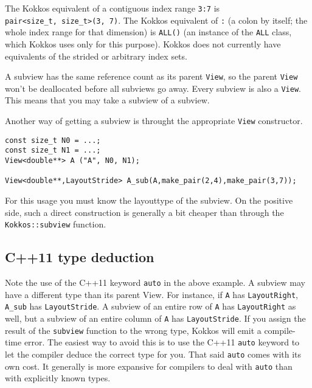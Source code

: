 The Kokkos equivalent of a contiguous index range \texttt{3:7} is \\
\lstinline!pair<size_t, size_t>(3, 7)!.  The Kokkos equivalent of
\texttt{:} (a colon by itself; the whole index range for that
dimension) is \texttt{ALL()} (an instance of the \texttt{ALL} class,
which Kokkos uses only for this purpose).  Kokkos does not currently
have equivalents of the strided or arbitrary index sets.

A subview has the same reference count as its parent \lstinline!View!, so the
parent \lstinline!View! won't be deallocated before all subviews go away.  Every
subview is also a \lstinline!View!.  This means that you may take a subview of a
subview.

Another way of getting a subview is throught the appropriate \lstinline{View} constructor.
\begin{lstlisting}
const size_t N0 = ...;
const size_t N1 = ...;
View<double**> A ("A", N0, N1);

View<double**,LayoutStride> A_sub(A,make_pair(2,4),make_pair(3,7));
\end{lstlisting}
For this usage you must know the layouttype of the subview. 
On the positive side, such a direct construction is generally a bit cheaper than
through the \lstinline!Kokkos::subview! function. 

\subsection{C++11 type deduction}\label{SS:Subviews:How:auto}

Note the use of the C++11 keyword \texttt{auto} in the above example.
A subview may have a different type than its parent View.  For
instance, if \lstinline!A! has \lstinline!LayoutRight!,
\lstinline!A_sub!  has \lstinline!LayoutStride!.  A subview of an
entire row of \lstinline!A! has \lstinline!LayoutRight! as well, but a
subview of an entire column of \lstinline!A! has
\lstinline!LayoutStride!.  If you assign the result of the
\texttt{subview} function to the wrong type, Kokkos will emit a
compile-time error.  The easiest way to avoid this is to use the C++11
\texttt{auto} keyword to let the compiler deduce the correct type for
you. That said \lstinline!auto! comes with its own cost. 
It generally is more expansive for compilers to deal with \lstinline!auto! than with 
explicitly known types. 

